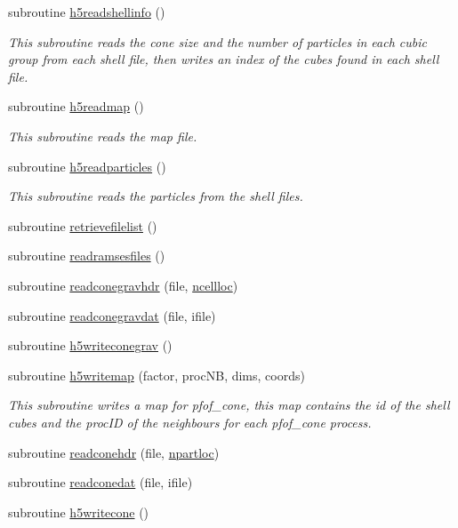 \begin{DoxyCompactItemize}
subroutine \hyperlink{namespacemodio_a5f1cc94eaee9d1f4f7bdca4cb63ee5bc}{h5readshellinfo} ()
\begin{DoxyCompactList}\small\item\em This subroutine reads the cone size and the number of particles in each cubic group from each shell file, then writes an index of the cubes found in each shell file. \end{DoxyCompactList}\item 
subroutine \hyperlink{namespacemodio_a0d3522f20c353a57b002c3120bc266f2}{h5readmap} ()
\begin{DoxyCompactList}\small\item\em This subroutine reads the map file. \end{DoxyCompactList}\item 
subroutine \hyperlink{namespacemodio_a8f70f66bd5285c807b17e0c89a6e0e4a}{h5readparticles} ()
\begin{DoxyCompactList}\small\item\em This subroutine reads the particles from the shell files. \end{DoxyCompactList}\item 
subroutine \hyperlink{namespacemodio_a49a42a212fba0853ef61f4f3360e6cb8}{retrievefilelist} ()
\item 
subroutine \hyperlink{namespacemodio_a65b2a30853dd9ec7641c578cb220a3fe}{readramsesfiles} ()
\item 
subroutine \hyperlink{namespacemodio_a781355181afb550bcc570313df840da4}{readconegravhdr} (file, \hyperlink{namespacemodio_a1c862995bd67ce8f4a3305dad6022064}{ncellloc})
\item 
subroutine \hyperlink{namespacemodio_a5ac9b7de3c680868d2114731e0dd67f2}{readconegravdat} (file, ifile)
\item 
subroutine \hyperlink{namespacemodio_a25a01a0565ebacb543ff8a55b5a51351}{h5writeconegrav} ()
\item 
subroutine \hyperlink{namespacemodio_aa0fe6635f944f6d4591f52191c7223c1}{h5writemap} (factor, proc\+NB, dims, coords)
\begin{DoxyCompactList}\small\item\em This subroutine writes a map for pfof\+\_\+cone, this map contains the id of the shell cubes and the proc\+ID of the neighbours for each pfof\+\_\+cone process. \end{DoxyCompactList}\item 
subroutine \hyperlink{namespacemodio_ac8d9a9aea4bf8df27247c29c816df78c}{readconehdr} (file, \hyperlink{namespacemodio_a0bf1df6ff1e675aabce26f3d7289a700}{npartloc})
\item 
subroutine \hyperlink{namespacemodio_a15ba57a85caae734e0b917de58988acd}{readconedat} (file, ifile)
\item 
subroutine \hyperlink{namespacemodio_a756eae4b92791daadf54d68094c44c8b}{h5writecone} ()
\end{DoxyCompactItemize}
